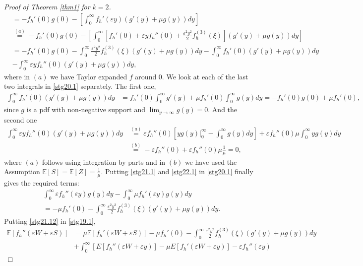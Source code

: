 \documentclass[11pt,letterpaper,reqno]{article}
\theoremstyle{thmstyleone}%
\theoremstyle{thmstyletwo}%
\theoremstyle{thmstylethree}%
\numberwithin{equation}{section}
\begin{document}
\begin{proof}[Proof of Theorem \ref{thm1} for $k=2$]
\begin{align}
&=-f_h'(0)g(0)-\left[\int_0^\infty f_h'(\varepsilon y)(g'(y)+\mu g(y))dy \right] \nonumber\\
&\stackrel{(a)}{=}-f_h'(0)g(0) 
-\left[\int_0^\infty \left[f_h'(0)+\varepsilon y f_h''(0)+\frac{\varepsilon^2y^2}{2}f_h^{(3)}(\xi)\right](g'(y)+\mu g(y))dy \right] \nonumber\\
&=-f_h'(0)g(0)-\int_0^\infty \frac{\varepsilon^2 y^2}{2}f_h^{(3)}(\xi)(g'(y)+\mu g(y))dy -\int_0^\infty f_h'(0)(g'(y)+\mu g(y))dy \nonumber\\
&-\int_0^\infty \varepsilon yf_h''(0)(g'(y)+\mu g(y))dy ,
\end{align}
where in $(a)$ we have Taylor expanded $f$ around 0. We look at each of the last two integrals in \eqref{stg20.1} separately. The first one,
\begin{align}\label{stg21.1}
    \int_0^\infty f_h'(0)(g'(y)+\mu g(y))dy&= f_h'(0) \int_0^{\infty}g'(y)+\mu f_h'(0) \int_0^{\infty}g(y)dy  
    =-f_h'(0)g(0)+\mu f_h'(0),
\end{align}
since $g$ is a pdf with non-negative support and  $\lim_{y \to \infty}g(y)=0$.
And the second one
\begin{align}\label{stg22.1}
    \int_0^\infty \varepsilon yf_h''(0)(g'(y)+\mu g(y))dy %
    &\stackrel{(a)}{=}\varepsilon f_h''(0)\left[yg(y)\bigg|_0^\infty-\int_0^\infty  g(y)dy \right]+\varepsilon f_h''(0)\mu \int_0^\infty yg(y)dy \nonumber \\
    &\stackrel{(b)}{=}-\varepsilon f_h''(0)+\varepsilon f_h''(0)\mu \frac{1}{\mu} 
    =0,
\end{align}
where $(a)$ follows using integration by parts and in $(b)$ we have used the Assumption $\mathbb E[S]=\mathbb E[Z]=\frac{1}{\mu}$. Putting \eqref{stg21.1} and \eqref{stg22.1} in \eqref{stg20.1} finally gives the required terms:
\begin{align}\label{stg21.12}
   & \int_0^\infty\varepsilon f_h''(\varepsilon y)g(y)dy-\int_0^\infty \mu f_h'(\varepsilon y)g(y)dy \nonumber\\
&=-\mu f_h'(0) -\int_0^\infty \frac{\varepsilon^2 y^2}{2}f_h^{(3)}(\xi)(g'(y)+\mu g(y))dy .
\end{align}
Putting \eqref{stg21.12} in \eqref{stg19.1},
\begin{align*}
    \mathbb E[f_h''(\varepsilon W+\varepsilon S)]&=\mu \mathbb E[f_h'(\varepsilon W+\varepsilon S)]-\mu f_h'(0) -\int_0^\infty \frac{\varepsilon^2 y^2}{2}f_h^{(3)}(\xi)(g'(y)+\mu g(y))dy \\
  &+\int_0^\infty \left[E[f_h''(\varepsilon W+\varepsilon y)]-\mu E[f_h'(\varepsilon W+\varepsilon y)]-\varepsilon f_h''(\varepsilon y)

\end{align*}
\end{proof}
\end{document}
